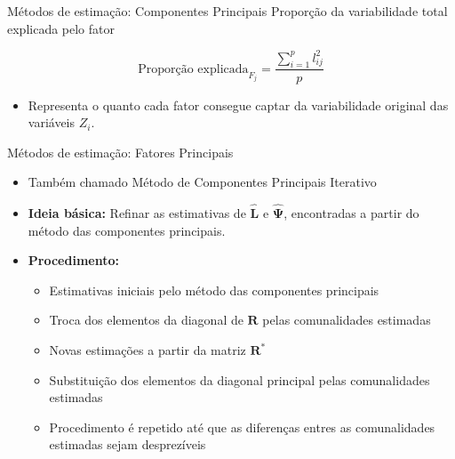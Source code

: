 \documentclass[
  ignorenonframetext,
  aspectratio=169,
]{beamer}
\providecommand{\tightlist}{%
  \setlength{\itemsep}{0pt}\setlength{\parskip}{0pt}}
\begin{document}
\begin{frame}{Métodos de estimação: Componentes Principais}
\label{muxe9todos-de-estimauxe7uxe3o-componentes-principais-2}
Proporção da variabilidade total explicada pelo fator

\[\text{Proporção explicada}_{F_j} = \dfrac{\sum \limits_{i=1}^p l_{ij}^2}{p}\]

\pause

\begin{itemize}
\tightlist
\item
  Representa o quanto cada fator consegue captar da variabilidade
  original das variáveis \(Z_i\).
\end{itemize}
\end{frame}

\begin{frame}{Métodos de estimação: Fatores Principais}
\label{muxe9todos-de-estimauxe7uxe3o-fatores-principais}
\begin{itemize}
\tightlist
\item
  Também chamado Método de Componentes Principais Iterativo
\end{itemize}

\pause

\begin{itemize}
\tightlist
\item
  \textbf{Ideia básica:} Refinar as estimativas de
  \(\hat{\boldsymbol{L}}\) e \(\hat{\boldsymbol{\Psi}}\), encontradas a
  partir do método das componentes principais.
\end{itemize}

\pause

\begin{itemize}
\tightlist
\item
  \textbf{Procedimento:}

  \begin{itemize}
  \tightlist
  \item
    Estimativas iniciais pelo método das componentes principais
  \item
    Troca dos elementos da diagonal de \(\boldsymbol{R}\) pelas
    comunalidades estimadas
  \item
    Novas estimações a partir da matriz \(\boldsymbol{R}^*\)
  \item
    Substituição dos elementos da diagonal principal pelas comunalidades
    estimadas
  \item
    Procedimento é repetido até que as diferenças entres as
    comunalidades estimadas sejam desprezíveis
  \end{itemize}
\end{itemize}
\end{frame}
\end{document}
